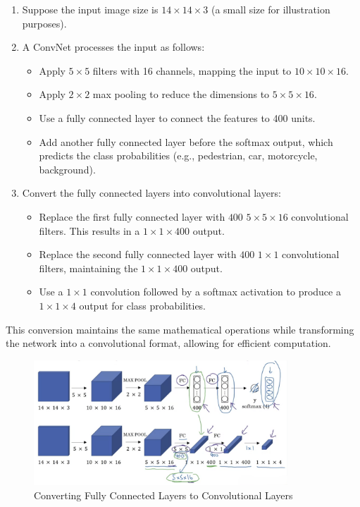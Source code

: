 \documentclass[letterpaper,12pt,notitlepage,twoside]{report}
\begin{document}
\begin{enumerate}
    \item Suppose the input image size is $14 \times 14 \times 3$ (a small size for illustration purposes).
    \item A ConvNet processes the input as follows:
    \begin{itemize}
        \item Apply $5 \times 5$ filters with 16 channels, mapping the input to $10 \times 10 \times 16$.
        \item Apply $2 \times 2$ max pooling to reduce the dimensions to $5 \times 5 \times 16$.
        \item Use a fully connected layer to connect the features to 400 units.
        \item Add another fully connected layer before the softmax output, which predicts the class probabilities (e.g., pedestrian, car, motorcycle, background).
    \end{itemize}
    \item Convert the fully connected layers into convolutional layers:
    \begin{itemize}
        \item Replace the first fully connected layer with $400$ $5 \times 5 \times 16$ convolutional filters. This results in a $1 \times 1 \times 400$ output.
        \item Replace the second fully connected layer with $400$ $1 \times 1$ convolutional filters, maintaining the $1 \times 1 \times 400$ output.
        \item Use a $1 \times 1$ convolution followed by a softmax activation to produce a $1 \times 1 \times 4$ output for class probabilities.
    \end{itemize}
\end{enumerate}

This conversion maintains the same mathematical operations while transforming the network into a convolutional format, allowing for efficient computation.

\begin{figure}[h]
	\centering
	\includegraphics[width=0.85\textwidth]{Images/FC to Convolution.png}
	\caption{Converting Fully Connected Layers to Convolutional Layers}
	\label{fig:42}
\end{figure}
\FloatBarrier
\end{document}
